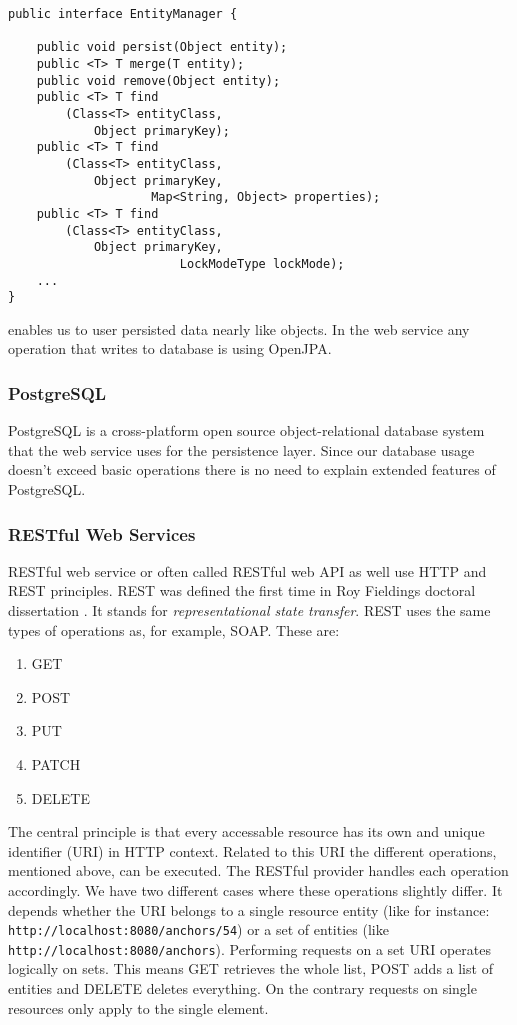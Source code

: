 \begin{lstlisting}
public interface EntityManager {

    public void persist(Object entity);
    public <T> T merge(T entity);
    public void remove(Object entity);
    public <T> T find
		(Class<T> entityClass, 
			Object primaryKey);
    public <T> T find
		(Class<T> entityClass, 
			Object primaryKey, 
                	Map<String, Object> properties); 
    public <T> T find
		(Class<T> entityClass, 
			Object primaryKey,
                      	LockModeType lockMode);
	...
}
\end{lstlisting}
enables us to user persisted data nearly like objects. 
In the web service any operation that writes to database is using OpenJPA.

\subsubsection*{PostgreSQL}
PostgreSQL is a cross-platform open source object-relational database system that the web service uses for the persistence layer. Since our database usage doesn't exceed basic operations there is no need to explain extended features of PostgreSQL.

\subsubsection*{RESTful Web Services}
RESTful web service or often called RESTful web API as well use HTTP and REST principles. REST was defined the first time in Roy Fieldings doctoral dissertation \cite{fielding2000architectural}. It stands for \emph{representational state transfer}. REST uses the same types of operations as, for example, SOAP. These are:

\begin{enumerate}
\item GET
\item POST
\item PUT
\item PATCH
\item DELETE
\end{enumerate}

The central principle is that every accessable resource has its own and unique identifier (URI) in HTTP context. Related to this URI the different operations, mentioned above, can be executed. The RESTful provider handles each operation accordingly. We have two different cases where these operations slightly differ. It depends whether the URI belongs to a single resource entity (like for instance: \verb^http://localhost:8080/anchors/54^) or a set of entities (like \verb^http://localhost:8080/anchors^). Performing requests on a set URI operates logically on sets. This means GET retrieves the whole list, POST adds a list of entities and DELETE deletes everything. On the contrary requests on single resources only apply to the single element.  
	
